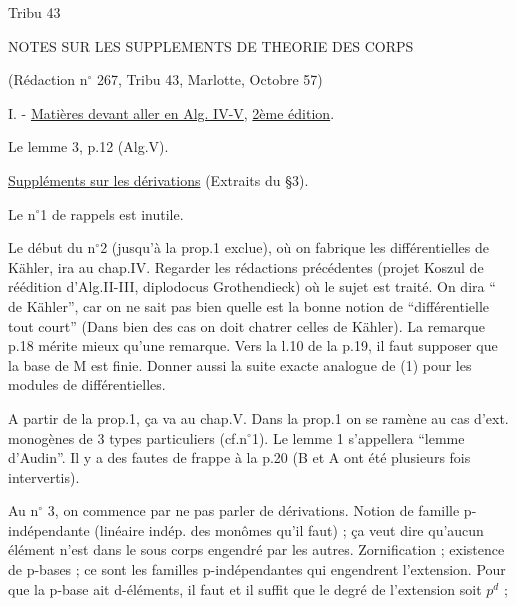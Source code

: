 Tribu 43

NOTES SUR LES SUPPLEMENTS DE THEORIE DES CORPS

(Rédaction n$^\circ$ 267, Tribu 43, Marlotte, Octobre 57)

I. - \uline{Matières devant aller en Alg. IV-V}, \uline{2ème édition}.

Le lemme 3, p.12 (Alg.V).

\uline{Suppléments sur les dérivations} (Extraits du \S3).

Le n$^\circ$1 de rappels est inutile.

Le début du n$^\circ$2 (jusqu'à la prop.1 exclue), où on fabrique les différentielles de Kähler, ira au chap.IV. Regarder les rédactions précédentes (projet Koszul de réédition d'Alg.II-III, diplodocus Grothendieck) où le sujet est traité. On dira `` de Kähler'', car on ne sait pas bien quelle est la bonne notion de ``différentielle tout court'' (Dans bien des cas on doit chatrer celles de Kähler). La remarque p.18 mérite mieux qu'une remarque. Vers la l.10 de la p.19, il faut supposer que la base de M est finie. Donner aussi la suite exacte analogue de (1) pour les modules de différentielles.

A partir de la prop.1, ça va au chap.V. Dans la prop.1 on se ramène au cas d'ext. monogènes de 3 types particuliers (cf.n$^\circ$1). Le lemme 1 s'appellera ``lemme d'Audin''. Il y a des fautes de frappe à la p.20 (B et A ont été plusieurs fois intervertis).

Au n$^\circ$ 3, on commence par ne pas parler de dérivations. Notion de famille p-indépendante (linéaire indép. des monômes qu'il faut) ; ça veut dire qu'aucun élément n'est dans le sous corps engendré par les autres. Zornification ; existence de p-bases ; ce sont les familles p-indépendantes qui engendrent l'extension. Pour que la p-base ait d-éléments, il faut et il suffit que le degré de l'extension soit $p^d$ ;


